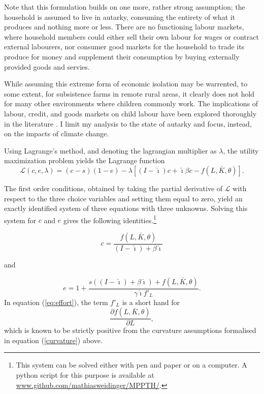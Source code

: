 \documentclass[a4paper,12pt]{article}
\theoremstyle{plain}
\theoremstyle{definition}
\theoremstyle{definition}
\theoremstyle{definition}
\theoremstyle{definition}
\begin{document}
Note that this formulation builds on one more, rather strong assumption; the household is assumed to live in autarky, consuming the entirety of what it produces and nothing more or less. There are no functioning labour markets, where household members could either sell their own labour for wages or contract external labourers, nor consumer good markets for the household to trade its produce for money and supplement their consumption by buying externally provided goods and servies.

While assuming this extreme form of economic isolation may be warrented, to some extent, for subsistence farms in remote rural areas, it clearly does not hold for many other environments where children commonly work. The implications of labour, credit, and goods markets on child labour have been explored thoroughly in the literature \citep[see e.g.,][]{Baland2000, Bhalotra2003,Dumas2013, Dumas2015, Dumas2020}. I limit my analysis to the state of autarky and focus, instead, on the impacts of climate change.

Using Lagrange's method, and denoting the lagrangian multiplier as $\lambda$, the utility maximization problem yields the Lagrange function
\begin{equation}
\label{lagrange}
    \mathcal{L}(c,e,\lambda)=(c-s)(1-e) -\lambda \left[(I-\hat{\imath})c+\hat{\imath}\beta c - f(L,\bar{K},\theta)\right].
\end{equation}

The first order conditions, obtained by taking the partial derivative of $\mathcal{L}$ with respect to the three choice variables and setting them equal to zero, yield an exactly identified system of three equations with three unknowns. Solving this system for $c$ and $e$ gives the following identities.\footnote{This system can be solved either with pen and paper or on a computer. A python script for this purpose is available at \href{https://github.com/mathiasweidinger/MPPTH}{www.github.com/mathiasweidinger/MPPTH/}.}

\begin{equation}
\label{eq:consumption}
    c=\frac{f(L, \bar{K}, \theta)}{(I-\hat{\imath})+\beta \hat{\imath}}
\end{equation}

and

\begin{equation}
\label{eq:effort}
    e=1+\frac{s((I-\hat{\imath})+\beta \hat{\imath})+f(L,\bar{K},\theta)}{\gamma \hat{\imath} f'_L}.
\end{equation}
In equation (\ref{eq:effort}), the term $f'_L$  is a short hand for
\begin{equation*}
    \frac{\partial f(L,\bar{K},\theta)}{\partial L},
\end{equation*}
which is known to be strictly positive from the curvature assumptions formalised in equation (\ref{curvature}) above.
\end{document}
